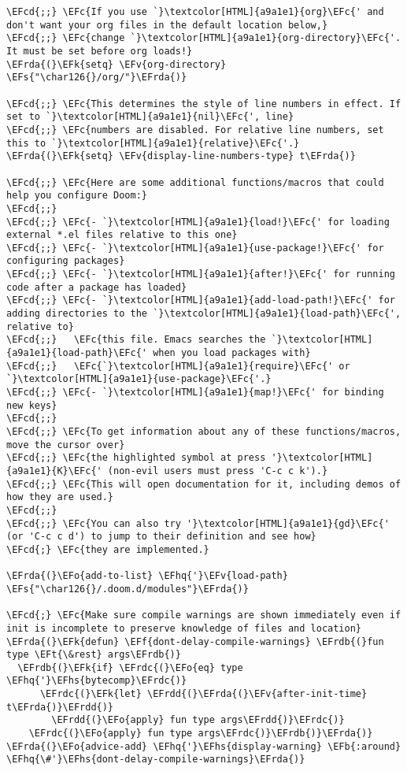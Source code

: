 \documentclass[a4wide,10pt]{article}
\newcommand{\EFc}[1]{\textcolor{EFc}{#1}} %
\newcommand{\EFcd}[1]{\textcolor{EFcd}{#1}} %
\newcommand{\EFs}[1]{\textcolor{EFs}{#1}} %
\newcommand{\EFk}[1]{\textcolor{EFk}{#1}} %
\newcommand{\EFb}[1]{\textcolor{EFb}{#1}} %
\newcommand{\EFf}[1]{\textcolor{EFf}{#1}} %
\newcommand{\EFv}[1]{\textcolor{EFv}{#1}} %
\newcommand{\EFt}[1]{\textcolor{EFt}{#1}} %
\newcommand{\EFo}[1]{\textcolor{EFo}{#1}} %
\newcommand{\EFhq}[1]{\textcolor{EFhq}{#1}} %
\newcommand{\EFhs}[1]{\textcolor{EFhs}{#1}} %
\newcommand{\EFrda}[1]{\textcolor{EFrda}{#1}} %
\newcommand{\EFrdb}[1]{\textcolor{EFrdb}{#1}} %
\newcommand{\EFrdc}[1]{\textcolor{EFrdc}{#1}} %
\newcommand{\EFrdd}[1]{\textcolor{EFrdd}{#1}} %
\begin{document}
\begin{Code}
\begin{Verbatim}
\EFcd{;;} \EFc{If you use `}\textcolor[HTML]{a9a1e1}{org}\EFc{' and don't want your org files in the default location below,}
\EFcd{;;} \EFc{change `}\textcolor[HTML]{a9a1e1}{org-directory}\EFc{'. It must be set before org loads!}
\EFrda{(}\EFk{setq} \EFv{org-directory} \EFs{"\char126{}/org/"}\EFrda{)}

\EFcd{;;} \EFc{This determines the style of line numbers in effect. If set to `}\textcolor[HTML]{a9a1e1}{nil}\EFc{', line}
\EFcd{;;} \EFc{numbers are disabled. For relative line numbers, set this to `}\textcolor[HTML]{a9a1e1}{relative}\EFc{'.}
\EFrda{(}\EFk{setq} \EFv{display-line-numbers-type} t\EFrda{)}

\EFcd{;;} \EFc{Here are some additional functions/macros that could help you configure Doom:}
\EFcd{;;}
\EFcd{;;} \EFc{- `}\textcolor[HTML]{a9a1e1}{load!}\EFc{' for loading external *.el files relative to this one}
\EFcd{;;} \EFc{- `}\textcolor[HTML]{a9a1e1}{use-package!}\EFc{' for configuring packages}
\EFcd{;;} \EFc{- `}\textcolor[HTML]{a9a1e1}{after!}\EFc{' for running code after a package has loaded}
\EFcd{;;} \EFc{- `}\textcolor[HTML]{a9a1e1}{add-load-path!}\EFc{' for adding directories to the `}\textcolor[HTML]{a9a1e1}{load-path}\EFc{', relative to}
\EFcd{;;}   \EFc{this file. Emacs searches the `}\textcolor[HTML]{a9a1e1}{load-path}\EFc{' when you load packages with}
\EFcd{;;}   \EFc{`}\textcolor[HTML]{a9a1e1}{require}\EFc{' or `}\textcolor[HTML]{a9a1e1}{use-package}\EFc{'.}
\EFcd{;;} \EFc{- `}\textcolor[HTML]{a9a1e1}{map!}\EFc{' for binding new keys}
\EFcd{;;}
\EFcd{;;} \EFc{To get information about any of these functions/macros, move the cursor over}
\EFcd{;;} \EFc{the highlighted symbol at press '}\textcolor[HTML]{a9a1e1}{K}\EFc{' (non-evil users must press 'C-c c k').}
\EFcd{;;} \EFc{This will open documentation for it, including demos of how they are used.}
\EFcd{;;}
\EFcd{;;} \EFc{You can also try '}\textcolor[HTML]{a9a1e1}{gd}\EFc{' (or 'C-c c d') to jump to their definition and see how}
\EFcd{;} \EFc{they are implemented.}

\EFrda{(}\EFo{add-to-list} \EFhq{'}\EFv{load-path} \EFs{"\char126{}/.doom.d/modules"}\EFrda{)}

\EFcd{;} \EFc{Make sure compile warnings are shown immediately even if init is incomplete to preserve knowledge of files and location}
\EFrda{(}\EFk{defun} \EFf{dont-delay-compile-warnings} \EFrdb{(}fun type \EFt{\&rest} args\EFrdb{)}
  \EFrdb{(}\EFk{if} \EFrdc{(}\EFo{eq} type \EFhq{'}\EFhs{bytecomp}\EFrdc{)}
      \EFrdc{(}\EFk{let} \EFrdd{(}\EFrda{(}\EFv{after-init-time} t\EFrda{)}\EFrdd{)}
        \EFrdd{(}\EFo{apply} fun type args\EFrdd{)}\EFrdc{)}
    \EFrdc{(}\EFo{apply} fun type args\EFrdc{)}\EFrdb{)}\EFrda{)}
\EFrda{(}\EFo{advice-add} \EFhq{'}\EFhs{display-warning} \EFb{:around} \EFhq{\#'}\EFhs{dont-delay-compile-warnings}\EFrda{)}


\end{Verbatim}
\end{Code}
\end{document}
